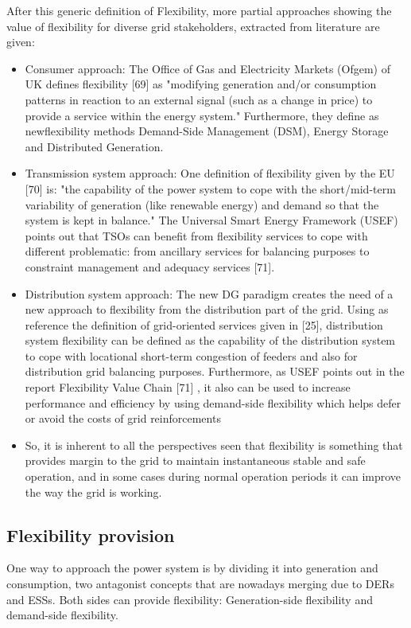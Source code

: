 After this generic definition of Flexibility, more partial approaches showing the value of flexibility
for diverse grid stakeholders, extracted from literature are given:
\begin{itemize}
\item Consumer approach: The Office of Gas and Electricity Markets (Ofgem) of UK defines flexibility
[69] as "modifying generation and/or consumption patterns in reaction to an external signal
(such as a change in price) to provide a service within the energy system." Furthermore, they
define as newflexibility methods Demand-Side Management (DSM), Energy Storage and
Distributed Generation.
\item Transmission system approach: One definition of flexibility given by the EU [70] is: "the
capability of the power system to cope with the short/mid-term variability of generation (like renewable
energy) and demand so that the system is kept in balance."
The Universal Smart Energy Framework (USEF) points out that TSOs can benefit from flexibility
services to cope with different problematic: from ancillary services for balancing purposes to constraint management and adequacy services [71].
\item Distribution system approach: The new DG paradigm creates the need of a new approach
to flexibility from the distribution part of the grid. Using as reference the definition
of grid-oriented services given in [25], distribution system flexibility can be defined
as the capability of the distribution system to cope with locational short-term congestion
of feeders and also for distribution grid balancing purposes. Furthermore, as USEF points
out in the report Flexibility Value Chain [71] , it also can be used to increase performance
and efficiency by using demand-side flexibility which helps defer or avoid the costs of grid
reinforcements
\item So, it is inherent to all the perspectives seen that flexibility is something that provides margin to
the grid to maintain instantaneous stable and safe operation, and in some cases during normal
operation periods it can improve the way the grid is working.
\end{itemize}
\subsection{Flexibility provision}
One way to approach the power system is by dividing it into generation and consumption, two
antagonist concepts that are nowadays merging due to DERs and ESSs. Both sides can provide
flexibility: Generation-side flexibility and demand-side flexibility. 

